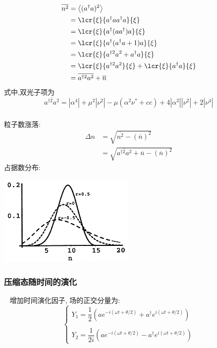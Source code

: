    \begin{frame}
    \frametitle{}
    \[ \begin{aligned}
        \overline{n^2} & = \left\langle (a^{\dagger} a)^2\right\rangle  \\ 
        &= \lcr{\xi} {a^{\dagger} a a^{\dagger} a} {\xi} \\ 
        &= \lcr{\xi} {a^{\dagger} (a a^{\dagger}) a} {\xi} \\ 
        &= \lcr{\xi} {a^{\dagger} (a^{\dagger} a +1) a} {\xi} \\ 
        &= \lcr{\xi} {a^{\dagger 2 }  a ^2 + a^{\dagger }a} {\xi} \\ 
        &= \lcr{\xi} {a^{\dagger 2 }  a ^2 } {\xi} +  \lcr{\xi} { a^{\dagger} a} {\xi} \\ 
        &= \overline{a^{\dagger 2 }  a ^2 } + \overline{n}
       \end{aligned}\] 
       式中,双光子项为 
       \[  \overline{a^{\dagger 2 }  a ^2 } = \left| \alpha ^4 \right| + \mu ^2 \left|\nu^2\right| - \mu (\alpha^2 \nu^* +cc) + 4 \left|\alpha^2 \right| \left|\nu^2\right| + 2 \left|\nu ^4\right|\] 
   \end{frame}

   \begin{frame}
    \frametitle{}
        粒子数涨落: 
    \[\begin{aligned}
             \Delta n & =\sqrt{ \overline{n^2} - (\overline{n})^2 } \\ 
             &= \sqrt{ \overline{a^{\dagger 2 }  a ^2 } + \overline{n} - (\overline{n})^2 }
    \end{aligned} \]
        占据数分布: 
      \begin{center}
           \includegraphics[width=0.5\textwidth]{figs/2022-05-03-23-54-35.png}
      \end{center}

   \end{frame}

   \begin{frame}
    \frametitle{压缩态随时间的演化} 
    \例 [7.  求压缩态随时间的演化规律]{
    }
    \解~ 增加时间演化因子, 场的正交分量为: 
    $$\left\{\begin{matrix}
        Y_1=\dfrac{1}{2}(a e^{-i (\omega t + \theta /2) }+a^\dagger e^{i (\omega t + \theta /2) })\\ 
        ~\\
        Y_2=\dfrac{1}{2i}(a e^{-i (\omega t + \theta /2) }-a^\dagger e^{i (\omega t + \theta /2) })
    \end{matrix}\right.$$
   \end{frame}

